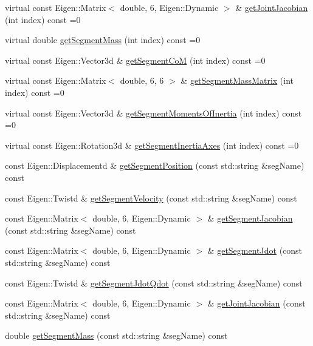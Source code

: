 \begin{DoxyCompactItemize}
\item 
virtual const Eigen\+::\+Matrix$<$ double, 6, Eigen\+::\+Dynamic $>$ \& \hyperlink{classocra_1_1Model_ad0001f469b4aa484403e781f6bd933aa}{get\+Joint\+Jacobian} (int index) const =0
\item 
virtual double \hyperlink{classocra_1_1Model_a9840649a6137c8ec964914f91c83a1b9}{get\+Segment\+Mass} (int index) const =0
\item 
virtual const Eigen\+::\+Vector3d \& \hyperlink{classocra_1_1Model_a577292e1e1441afbecb3912124b7eb04}{get\+Segment\+CoM} (int index) const =0
\item 
virtual const Eigen\+::\+Matrix$<$ double, 6, 6 $>$ \& \hyperlink{classocra_1_1Model_ae795ffdaa76419eb74acba87555b83bb}{get\+Segment\+Mass\+Matrix} (int index) const =0
\item 
virtual const Eigen\+::\+Vector3d \& \hyperlink{classocra_1_1Model_ae296f35e785641df23e6cf4fdbb24f8a}{get\+Segment\+Moments\+Of\+Inertia} (int index) const =0
\item 
virtual const Eigen\+::\+Rotation3d \& \hyperlink{classocra_1_1Model_a09d58bf429940098baf9727140e37441}{get\+Segment\+Inertia\+Axes} (int index) const =0
\item 
const Eigen\+::\+Displacementd \& \hyperlink{classocra_1_1Model_a5206b4474952da51b30ff3cdc5b310c2}{get\+Segment\+Position} (const std\+::string \&seg\+Name) const
\item 
const Eigen\+::\+Twistd \& \hyperlink{classocra_1_1Model_a01f56bca692e0907a641f0dce70e6ed2}{get\+Segment\+Velocity} (const std\+::string \&seg\+Name) const
\item 
const Eigen\+::\+Matrix$<$ double, 6, Eigen\+::\+Dynamic $>$ \& \hyperlink{classocra_1_1Model_abed0a7830611b6a76c57e0d7ab93e59b}{get\+Segment\+Jacobian} (const std\+::string \&seg\+Name) const
\item 
const Eigen\+::\+Matrix$<$ double, 6, Eigen\+::\+Dynamic $>$ \& \hyperlink{classocra_1_1Model_ad10d92280b1f57a55be28e50058d131b}{get\+Segment\+Jdot} (const std\+::string \&seg\+Name) const
\item 
const Eigen\+::\+Twistd \& \hyperlink{classocra_1_1Model_ac388cdc62947904aa0347a8c77d3d9d5}{get\+Segment\+Jdot\+Qdot} (const std\+::string \&seg\+Name) const
\item 
const Eigen\+::\+Matrix$<$ double, 6, Eigen\+::\+Dynamic $>$ \& \hyperlink{classocra_1_1Model_a0adc740df0aff2f5da852421933fa493}{get\+Joint\+Jacobian} (const std\+::string \&seg\+Name) const
\item 
double \hyperlink{classocra_1_1Model_aae854cb3ec08b4490d8529e92ff6ac8c}{get\+Segment\+Mass} (const std\+::string \&seg\+Name) const

\end{DoxyCompactItemize}

